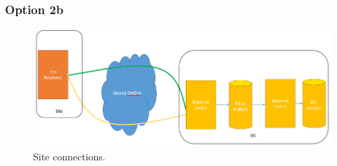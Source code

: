 \documentclass[12pt,a4paper]{article}
\begin{document}
\subsubsection{Option 2b}
\label{sssec:option2b}
\begin{figure}[h]
\centering
\includegraphics[width=\textwidth]{photon_option_2b.png}
\caption{Site connections.\label{fig:option_2b}
}
\end{figure}

\newpage
{}

\end{document}
